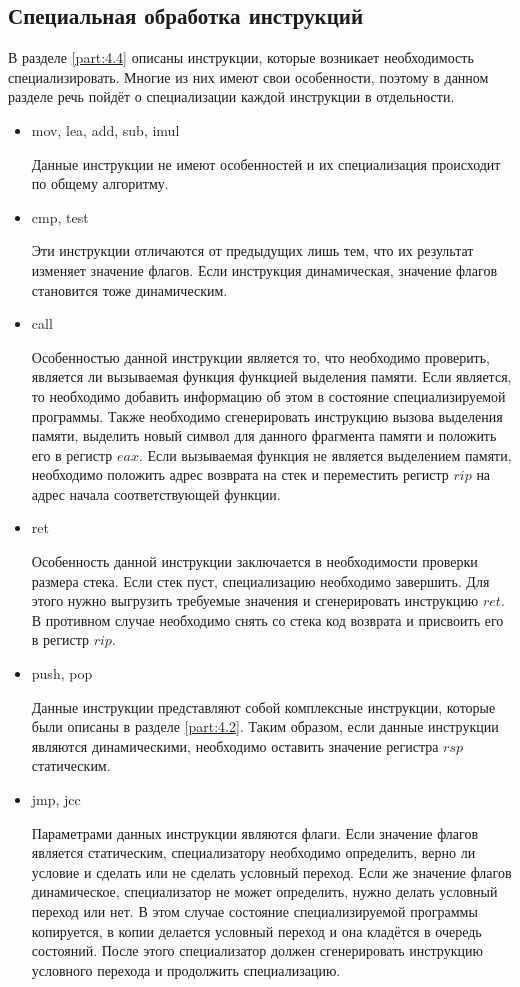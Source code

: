 \subsection{Специальная обработка инструкций}
\label{part:5.4}
В разделе \ref{part:4.4} описаны инструкции, которые возникает необходимость специализировать. Многие из них имеют свои особенности, поэтому в данном разделе речь пойдёт о специализации каждой инструкции в отдельности.
\begin{itemize}
\item{mov, lea, add, sub, imul}

Данные инструкции не имеют особенностей и их специализация происходит по общему алгоритму.
\item{cmp, test}

Эти инструкции отличаются от предыдущих лишь тем, что их результат изменяет значение флагов. Если инструкция динамическая, значение флагов становится тоже динамическим.
\item{call}

Особенностью данной инструкции является то, что необходимо проверить, является ли вызываемая функция функцией выделения памяти. Если является, то необходимо добавить информацию об этом в состояние специализируемой программы. Также необходимо сгенерировать инструкцию вызова выделения памяти, выделить новый символ для данного фрагмента памяти и положить его в регистр $eax$. Если вызываемая функция не является выделением памяти, необходимо положить адрес возврата на стек и переместить регистр $rip$ на адрес начала соответствующей функции.
\item{ret}

Особенность данной инструкции заключается в необходимости проверки размера стека. Если стек пуст, специализацию необходимо завершить. Для этого нужно выгрузить требуемые значения и сгенерировать инструкцию $ret$. В противном случае необходимо снять со стека код возврата и присвоить его в регистр $rip$.
\item{push, pop}

Данные инструкции представляют собой комплексные инструкции, которые были описаны в разделе \ref{part:4.2}. Таким образом, если данные инструкции являются динамическими, необходимо оставить значение регистра $rsp$ статическим.
\item{jmp, jcc}

Параметрами данных инструкции являются флаги. Если значение флагов является статическим, специализатору необходимо определить, верно ли условие и сделать или не сделать условный переход. Если же значение флагов динамическое, специализатор не может определить, нужно делать условный переход или нет. В этом случае состояние специализируемой программы копируется, в копии делается условный переход и она кладётся в очередь состояний. После этого специализатор должен сгенерировать инструкцию условного перехода и продолжить специализацию.
\end{itemize}


